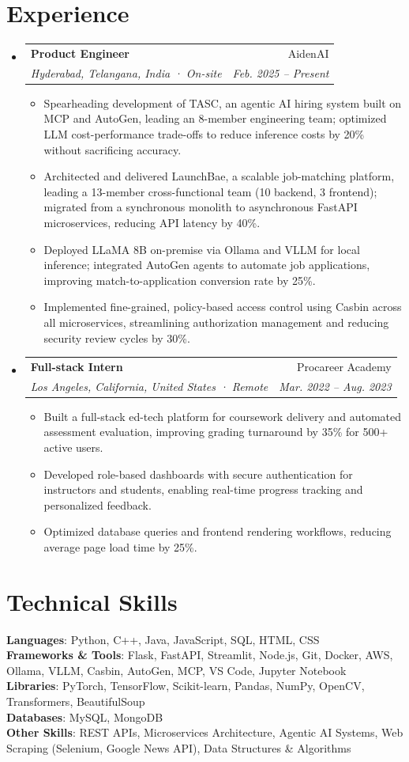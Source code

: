 \documentclass[letterpaper,11pt]{article}
\makeatletter
\newcommand{\resumeItem}[1]{
  \item\small{
    {#1 \vspace{-2pt}}
  }
}
\newcommand{\resumeSubheading}[4]{
  \vspace{-2pt}\item
    \begin{tabular*}{0.97\textwidth}[t]{l@{\extracolsep{\fill}}r}
      \textbf{#1} & #2 \\
      \textit{\small#3} & \textit{\small #4} \\
    \end{tabular*}\vspace{-7pt}
}
\newcommand{\resumeSubHeadingListStart}{\begin{itemize}[leftmargin=0.15in, label={}]}
\newcommand{\resumeSubHeadingListEnd}{\end{itemize}}
\newcommand{\resumeItemListStart}{\begin{itemize}}
\newcommand{\resumeItemListEnd}{\end{itemize}\vspace{-5pt}}
\makeatother
\begin{document}
\section{\textcolor{blue(pigment)}{Experience}}
  \resumeSubHeadingListStart
    \resumeSubheading
      {Product Engineer}{AidenAI}
      {Hyderabad, Telangana, India · On-site}{Feb. 2025 -- Present}
      \resumeItemListStart
        \resumeItem{Spearheading development of TASC, an agentic AI hiring system built on MCP and AutoGen, leading an 8-member engineering team; optimized LLM cost-performance trade-offs to reduce inference costs by 20\% without sacrificing accuracy.}
        \resumeItem{Architected and delivered LaunchBae, a scalable job-matching platform, leading a 13-member cross-functional team (10 backend, 3 frontend); migrated from a synchronous monolith to asynchronous FastAPI microservices, reducing API latency by 40\%.}
        \resumeItem{Deployed LLaMA 8B on-premise via Ollama and VLLM for local inference; integrated AutoGen agents to automate job applications, improving match-to-application conversion rate by 25\%.}
        \resumeItem{Implemented fine-grained, policy-based access control using Casbin across all microservices, streamlining authorization management and reducing security review cycles by 30\%.}
      \resumeItemListEnd

    \resumeSubheading
      {Full-stack Intern}{Procareer Academy}
      {Los Angeles, California, United States · Remote}{Mar. 2022 -- Aug. 2023}
      \resumeItemListStart
        \resumeItem{Built a full-stack ed-tech platform for coursework delivery and automated assessment evaluation, improving grading turnaround by 35\% for 500+ active users.}
        \resumeItem{Developed role-based dashboards with secure authentication for instructors and students, enabling real-time progress tracking and personalized feedback.}
        \resumeItem{Optimized database queries and frontend rendering workflows, reducing average page load time by 25\%.}
      \resumeItemListEnd
  \resumeSubHeadingListEnd

\section{\textcolor{blue(pigment)}{Technical Skills}}
 \begin{itemize}[leftmargin=0.15in, label={}]
    \small{\item{
     \textbf{Languages}{: Python, C++, Java, JavaScript, SQL, HTML, CSS} \\
     \textbf{Frameworks \& Tools}{: Flask, FastAPI, Streamlit, Node.js, Git, Docker, AWS, Ollama, VLLM, Casbin, AutoGen, MCP, VS Code, Jupyter Notebook} \\
     \textbf{Libraries}{: PyTorch, TensorFlow, Scikit-learn, Pandas, NumPy, OpenCV, Transformers, BeautifulSoup} \\
     \textbf{Databases}{: MySQL, MongoDB} \\
     \textbf{Other Skills}{: REST APIs, Microservices Architecture, Agentic AI Systems, Web Scraping (Selenium, Google News API), Data Structures \& Algorithms}
    }}
 \end{itemize}
\end{document}
